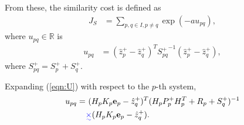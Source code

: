 \documentclass[letterpaper, 10pt, conference]{ieeeconf}
\newcommand{\refeqn}[1]{(\ref{eqn:#1})}
\renewcommand{\Re}{\ensuremath{\mathbb{R}}}
\providecommand{\DIFadd}[1]{{\protect\color{blue}\uwave{#1}}} %
\providecommand{\DIFaddbegin}{} %
\providecommand{\DIFaddend}{} %
\providecommand{\DIFdelbegin}{} %
\providecommand{\DIFdelend}{} %
\begin{document}
From these, the similarity cost is defined as
\begin{align}
J_S&=\sum\limits_{p,q\in I,p\neq q}\exp (-au_{pq}),
\end{align}
where $u_{pq}\in\Re$ is
\begin{align}
u_{pq} & = (\hat z_{p}^+-\hat z^+_{q})^T{S^+_{pq}}^{-1}(\hat z^+_{p}-\hat z^+_{q})\label{eqn:U},
\end{align}
where $S^+_{pq}=S^+_{p}+S^+_{q}$. \DIFdelbegin %

\DIFdelend Expanding \refeqn{U} with respect to the $p$-th system,
\begin{align}
u_{pq}=&\ 
(H_pK_p{\bf e}_p-\hat z^+_{q})^T
(H_pP^+_{p}H_p^T+R_p+S^+_q)^{-1}\nonumber
\\
&\DIFdelbegin %
\DIFdelend \DIFaddbegin \DIFadd{\times  
}\DIFaddend (H_pK_p{\bf e}_p-\hat z^+_{q}).
\end{align}
\newcommand{\Ibd}{\ensuremath{\mathbf{1}_{bd}}}
\end{document}
